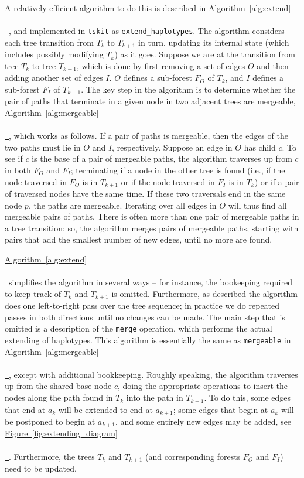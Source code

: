\documentclass[10pt,twoside,lineno]{gsajnl}
\newcommand{\tskit}{\texttt{tskit}}
\newcommand{\algorithmref}[2][]{%
	\hyperref[{#2}]{%
		Algorithm~\ref*{#2}%
		\ifx\\#1\\%
		\else
		\,#1%
		\fi
	}%
}
\newcommand*{\figref}[2][]{%
	\hyperref[{#2}]{%
		Figure~\ref*{#2}%
		\ifx\\#1\\%
		\else
		\,#1%
		\fi
	}%
}
\begin{document}
A relatively efficient algorithm to do this is described in \algorithmref{alg:extend}, 
and implemented in \tskit{} as \texttt{extend\_haplotypes}.
The algorithm considers each tree transition from $T_k$ to $T_{k+1}$ in turn, updating its internal state
(which includes possibly modifying $T_k$) as it goes.
Suppose we are at the transition from tree $T_k$ to tree $T_{k+1}$,
which is done by first removing a set of edges $O$
and then adding another set of edges $I$.
$O$ defines a sub-forest $F_O$ of $T_k$,
and $I$ defines a sub-forest $F_I$ of $T_{k+1}$.
The key step in the algorithm is to determine whether the pair of paths
that terminate in a given node in two adjacent trees are mergeable,
\algorithmref{alg:mergeable}, which works as follows.
If a pair of paths is mergeable,
then the edges of the two paths must lie in $O$ and $I$, respectively.
Suppose an edge in $O$ has child $c$.
To see if $c$ is the base of a pair of mergeable paths,
the algorithm traverses up from $c$ in both $F_O$ and $F_I$;
terminating if a node in the other tree is found
(i.e., if the node traversed in $F_O$ is in $T_{k+1}$ or if the node traversed in $F_I$ is in $T_k$)
or if a pair of traversed nodes have the same time.
If these two traversals end in the same node $p$, the paths are mergeable.
Iterating over all edges in $O$ will thus find all mergeable pairs of paths.
There is often more than one pair of mergeable paths in a tree transition;
so, the algorithm merges pairs of mergeable paths,
starting with pairs that add the smallest number of new edges,
until no more are found.


\algorithmref{alg:extend} simplifies the algorithm in several ways --
for instance, the bookeeping required to keep track of $T_k$ and $T_{k+1}$ is omitted.
Furthermore, as described the algorithm does one left-to-right pass over the tree sequence;
in practice we do repeated passes in both directions until no changes can be made.
The main step that is omitted is a description of the \texttt{merge} operation,
which performs the actual extending of haplotypes.
This algorithm is essentially the same as \texttt{mergeable} in \algorithmref{alg:mergeable},
except with additional bookkeeping.
Roughly speaking, the algorithm
traverses up from the shared base node $c$,
doing the appropriate operations to insert the nodes along the path found in $T_k$
into the path in $T_{k+1}$.
To do this, some edges that end at $a_k$ will be extended to end at $a_{k+1}$;
some edges that begin at $a_k$ will be postponed to begin at $a_{k+1}$,
and some entirely new edges may be added, see \figref{fig:extending_diagram}.
Furthermore, the trees $T_k$ and $T_{k+1}$ (and corresponding forests $F_O$ and $F_I$)
need to be updated.
\end{document}
